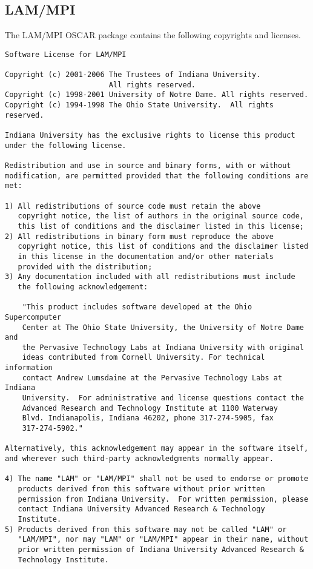 %
%

\subsection{LAM/MPI}
The LAM/MPI OSCAR package contains the following copyrights and
licenses.

\begin{verbatim}
Software License for LAM/MPI

Copyright (c) 2001-2006 The Trustees of Indiana University.  
                        All rights reserved.
Copyright (c) 1998-2001 University of Notre Dame. All rights reserved.
Copyright (c) 1994-1998 The Ohio State University.  All rights reserved.

Indiana University has the exclusive rights to license this product
under the following license.

Redistribution and use in source and binary forms, with or without
modification, are permitted provided that the following conditions are
met:

1) All redistributions of source code must retain the above
   copyright notice, the list of authors in the original source code,
   this list of conditions and the disclaimer listed in this license; 
2) All redistributions in binary form must reproduce the above
   copyright notice, this list of conditions and the disclaimer listed
   in this license in the documentation and/or other materials
   provided with the distribution; 
3) Any documentation included with all redistributions must include
   the following acknowledgement:

    "This product includes software developed at the Ohio Supercomputer
    Center at The Ohio State University, the University of Notre Dame and
    the Pervasive Technology Labs at Indiana University with original
    ideas contributed from Cornell University. For technical information
    contact Andrew Lumsdaine at the Pervasive Technology Labs at Indiana
    University.  For administrative and license questions contact the
    Advanced Research and Technology Institute at 1100 Waterway
    Blvd. Indianapolis, Indiana 46202, phone 317-274-5905, fax
    317-274-5902."

Alternatively, this acknowledgement may appear in the software itself,
and wherever such third-party acknowledgments normally appear.

4) The name "LAM" or "LAM/MPI" shall not be used to endorse or promote
   products derived from this software without prior written
   permission from Indiana University.  For written permission, please
   contact Indiana University Advanced Research & Technology
   Institute.  
5) Products derived from this software may not be called "LAM" or
   "LAM/MPI", nor may "LAM" or "LAM/MPI" appear in their name, without
   prior written permission of Indiana University Advanced Research &
   Technology Institute. 


\end{verbatim}
